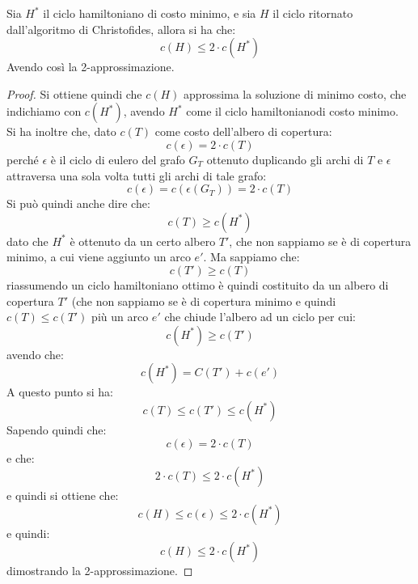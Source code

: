 																      	\begin{teorema}
																      		Sia $H^*$ il ciclo hamiltoniano di costo minimo, e sia $H$ il ciclo ritornato
																      		dall’algoritmo di Christofides, allora si ha che:
																      		\[c(H)\leq 2\cdot c(H^*)\]
																      		Avendo così la 2-approssimazione.
																      	\end{teorema}
																      	\begin{proof}
																      		Si ottiene quindi che $c(H)$ approssima la soluzione di minimo costo, che
																      		indichiamo con $c(H^*)$, avendo $H^*$ come il ciclo hamiltonianodi costo
																      		minimo. \\
																      		Si ha inoltre che, dato $c(T)$ come costo dell'albero di copertura:
																      		\[c(\epsilon)=2\cdot c(T)\]
																      		perché $\epsilon$ è il ciclo di eulero del grafo $G_T$ ottenuto duplicando gli
																      		archi di $T$ e $\epsilon$ attraversa una sola volta tutti gli archi di tale
																      		grafo:
																      		\[c(\epsilon)=c(\epsilon(G_T))=2\cdot c(T)\]
																      		Si può quindi anche dire che:
																      		\[c(T)\geq c(H^*)\]
																      		dato che $H^*$ è ottenuto da un certo albero $T'$, che non sappiamo se è di
																      		copertura minimo, a cui viene aggiunto un arco $e'$.
																      		Ma sappiamo che:
																      		\[c(T')\geq c(T)\]
																      		riassumendo un ciclo hamiltoniano ottimo è quindi costituito da un albero di
																      		copertura $T'$ (che non sappiamo se è di copertura minimo e quindi $c(T)\leq
																      		c(T')$ più un arco $e'$ che chiude l'albero ad un ciclo per cui: 
																      		\[c(H^*)\geq c(T')\]
																      		avendo che:
																      		\[c(H^*)=C(T')+c(e')\]
																      		A questo punto si ha:
																      		\[c(T)\leq c(T')\leq c(H^*)\]
																      		Sapendo quindi che:
																      		\[c(\epsilon)=2\cdot c(T)\]
																      		e che:
																      		\[2\cdot c(T)\leq 2\cdot c(H^*)\]
																      		e quindi si ottiene che:
																      		\[c(H)\leq c(\epsilon)\leq 2\cdot c(H^*)\]
																      		e quindi:
																      		\[c(H)\leq 2\cdot c(H^*)\]
																      		dimostrando la 2-approssimazione.
																      	\end{proof}
																      																	      	
